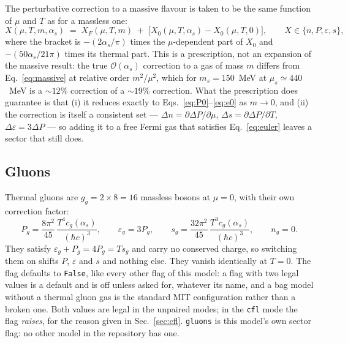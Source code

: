 \documentclass[aps,prc,onecolumn,superscriptaddress,nofootinbib,10pt]{revtex4-2}
\newcommand{\hc}{(\hbar c)^3}
\newcommand{\as}{\alpha_s}
\begin{document}
The perturbative correction to a massive flavour is taken to be the same
function of $\mu$ and $T$ as for a massless one:
%
\begin{equation}
X(\mu, T, m, \as) \;=\; X_F(\mu, T, m)
   \;+\; \big[ X_0(\mu, T, \as) - X_0(\mu, T, 0) \big] ,
\qquad X \in \{ n, P, \varepsilon, s \} ,
\label{eq:massive}
\end{equation}
%
where the bracket is $-(2\as/\pi)$ times the $\mu$-dependent part of $X_0$ and
$-(50\as/21\pi)$ times its thermal part. This is a prescription, not an
expansion of the massive result: the true $\mathcal{O}(\as)$ correction to a
gas of mass $m$ differs from Eq.~\eqref{eq:massive} at relative order
$m^2/\mu^2$, which for $m_s = 150$~MeV at $\mu_s \simeq 440$~MeV is a
$\sim 12\%$ correction of a $\sim 19\%$ correction. What the prescription does
guarantee is that (i) it reduces exactly to
Eqs.~\eqref{eq:P0}--\eqref{eq:e0} as $m \to 0$, and (ii) the correction is
itself a consistent set --- $\Delta n = \partial \Delta P/\partial\mu$,
$\Delta s = \partial \Delta P/\partial T$, $\Delta\varepsilon = 3 \Delta P$ ---
so adding it to a free Fermi gas that satisfies Eq.~\eqref{eq:euler} leaves a
sector that still does.

\subsection{Gluons}

Thermal gluons are $g_g = 2 \times 8 = 16$ massless bosons at $\mu = 0$, with
their own correction factor:
%
\begin{equation}
P_g = \frac{8\pi^2}{45}\, \frac{T^4 c_g(\as)}{\hc} , \qquad
\varepsilon_g = 3 P_g , \qquad
s_g = \frac{32\pi^2}{45}\, \frac{T^3 c_g(\as)}{\hc} , \qquad
n_g = 0 .
\label{eq:gluons}
\end{equation}
%
They satisfy $\varepsilon_g + P_g = 4 P_g = T s_g$ and carry no conserved
charge, so switching them on shifts $P$, $\varepsilon$ and $s$ and nothing
else. They vanish identically at $T = 0$. The flag defaults to \texttt{False},
like every other flag of this model: a flag with two legal values is a default
and is off unless asked for, whatever its name, and a bag model without a
thermal gluon gas is the standard MIT configuration rather than a broken one.
Both values are legal in the unpaired modes; in the \texttt{cfl} mode the flag
\emph{raises}, for the reason given in Sec.~\ref{sec:cfl}.
\texttt{gluons} is this model's own
sector flag: no other model in the repository has one.
\end{document}
